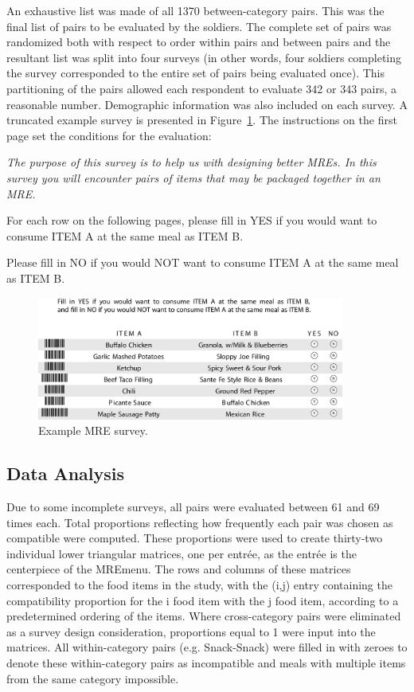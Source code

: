 An exhaustive list was made of all 1370 between-category pairs.  This was the final list of pairs to be evaluated by the soldiers.  The complete set of pairs was randomized both with respect to order within pairs and between pairs and the resultant list was split into four surveys (in other words, four soldiers completing the survey corresponded to the entire set of pairs being evaluated once).  This partitioning of the pairs allowed each respondent to evaluate 342 or 343 pairs, a reasonable number.  Demographic information was also included on each survey.  A truncated example survey is presented in Figure~\ref{fig:mresurvey}.  The instructions on the first page set the conditions for the evaluation:

\noindent
{\it The purpose of this survey is to help us with designing better MREs. In this survey you will encounter pairs of items that may be packaged together in an MRE.

\noindent
For each row on the following pages, please fill in YES if you would want to consume ITEM A at the same meal as ITEM B.

\noindent
Please fill in NO if you would NOT want to consume ITEM A at the same meal as ITEM B.}

\begin{figure}[h!]
\caption{Example MRE survey.}
\label{fig:mresurvey}
\centering
\includegraphics[width=0.9\textwidth]{./img/Figure51.png}
\end{figure}

\subsection{Data Analysis}
Due to some incomplete surveys, all pairs were evaluated between 61 and 69 times each.  Total proportions reflecting how frequently each pair was chosen as compatible were computed.  These proportions were used to create thirty-two individual lower triangular matrices, one per entr\'{e}e, as the entr\'{e}e is the centerpiece of the MRE\tm menu.  The rows and columns of these matrices corresponded to the food items in the study, with the (i,j) entry containing the compatibility proportion for the i food item with the j food item, according to a predetermined ordering of the items.  Where cross-category pairs were eliminated as a survey design consideration, proportions equal to 1 were input into the matrices.  All within-category pairs (e.g. Snack-Snack) were filled in with zeroes to denote these within-category pairs as incompatible and meals with multiple items from the same category impossible.

